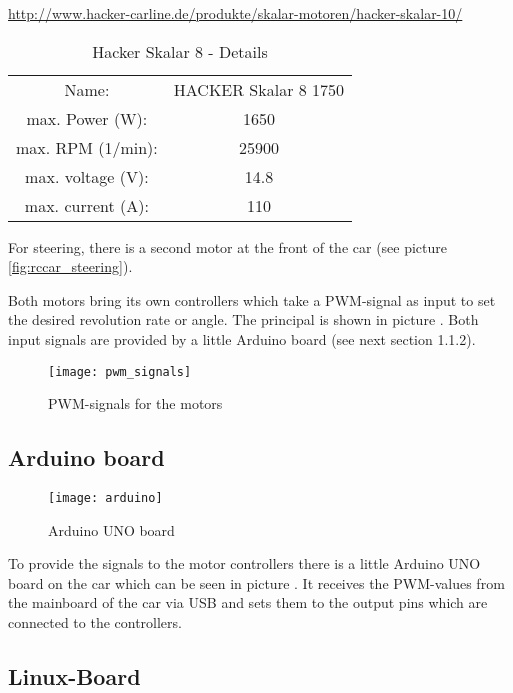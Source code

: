 \hyperref[http://www.hacker-carline.de/produkte/skalar-motoren/hacker-skalar-10/]{http://www.hacker-carline.de/produkte/skalar-motoren/hacker-skalar-10/}

\begin{table}[b]
	\centering	
	\begin{tabular}{cc} %
		\hline 
		Name: & HACKER Skalar 8 1750 \\
		max. Power (W): & 1650 \\
		max. RPM (1/min): & 25900 \\
		max. voltage (V): & 14.8 \\
		max. current (A): & 110 \\
		\hline
	\end{tabular}
	\caption{Hacker Skalar 8 - Details} %
	\label{tab:motor_details}
\end{table}


For steering, there is a second motor at the front of the car (see picture \ref{fig:rccar_steering}).

Both motors bring its own controllers which take a PWM-signal as input to set the desired revolution rate or angle. The principal is shown in picture . Both input signals are provided by a little Arduino board (see next section 1.1.2).

\begin{figure}[h]
	\centering
		\texttt{[image: pwm\_signals]}
	\caption{PWM-signals for the motors}
	\label{fig:pwm_signals}
\end{figure}


\subsection{Arduino board}
\label{sec:overview_arduino}
\begin{figure}[h]
	\centering
		\texttt{[image: arduino]}
	\caption{Arduino UNO board}
	\label{fig:arduino}
\end{figure}

To provide the signals to the motor controllers there is a little Arduino UNO board on the car which can be seen in picture . It receives the PWM-values from the mainboard of the car via USB and sets them to the output pins which are connected to the controllers.

\subsection{Linux-Board}
\label{sec:overview_board}

